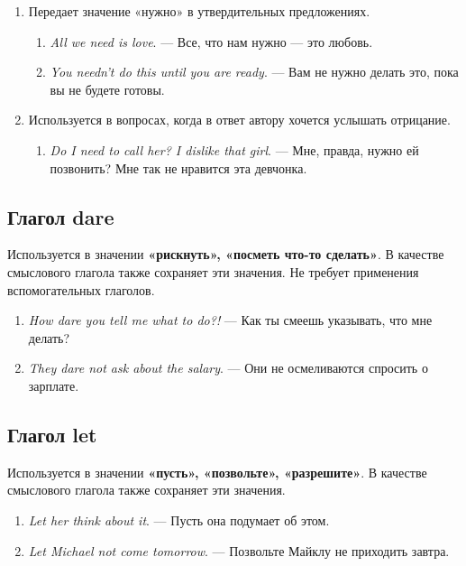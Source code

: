 \documentclass{article}
\begin{document}
\begin{enumerate}
	\item Передает значение «нужно» в утвердительных предложениях.
	\begin{enumerate}
		\item \emph{All we need is love}. — Все, что нам нужно — это любовь. 
		\item \emph{You needn’t do this until you are ready}. — Вам не нужно делать это, пока вы не будете готовы. 
	\end{enumerate}
	\item Используется в вопросах, когда в ответ автору хочется услышать отрицание.
	\begin{enumerate}
		\item \emph{Do I need to call her? I dislike that girl}. — Мне, правда, нужно ей позвонить? Мне так не нравится эта девчонка. 
	\end{enumerate}
\end{enumerate}

\subsection{Глагол \textbf{dare}}

Используется в значении \textbf{«рискнуть», «посметь что-то сделать»}. В качестве смыслового глагола также сохраняет эти значения. Не требует применения вспомогательных глаголов. 

\begin{enumerate}
	\item \emph{How dare you tell me what to do?!} — Как ты смеешь указывать, что мне делать? 
	\item \emph{They dare not ask about the salary}. — Они не осмеливаются спросить о зарплате. 
\end{enumerate}

\subsection{Глагол \textbf{let}}

Используется в значении \textbf{«пусть», «позвольте», «разрешите»}. В качестве смыслового глагола также сохраняет эти значения. 

\begin{enumerate}
	\item \emph{Let her think about it}. — Пусть она подумает об этом. 
	\item \emph{Let Michael not come tomorrow}. — Позвольте Майклу не приходить завтра. 
\end{enumerate}
\end{document}
